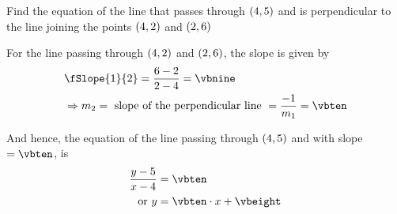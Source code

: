 \gcalcexpr[2]{\vbseven}{\vbfour - \vbtwo}
\gcalcexpr[2]{\vbeight}{ \vbthree - \vbone}
\gcalcexpr[0]{\vbnine}{(\vbseven / \vbeight) }

\gcalcexpr[2]{\vbeight}{\vbsix - (\vbten * \vbfive)}

\question Find the equation of the line that passes through $(4,5)$ and 
is perpendicular to the line joining the points $(4,2)$ and $(2, 6)$

\insertQR{}

\watchout

\ifprintanswers
\fi 

\begin{solution}
	For the line passing through $(4, 2)$ and $(2, 6)$, the slope is given by 
	\begin{align}
		& \fSlope{1}{2} = \dfrac{\vbfour - \vbtwo}{\vbthree - \vbone} = \vbnine \\
		& \Rightarrow m_2 = \text{ slope of the perpendicular line } = \dfrac{-1}{m_1} = \vbten
	\end{align}
	
	And hence, the equation of the line passing through $(4,5)$ and with slope $= \vbten$, is
	\begin{align}
		\dfrac{y-\vbsix}{x-\vbfive} &= \vbten \\
		\text{ or } y &= \vbten\cdot x + \vbeight
	\end{align}
\end{solution}
